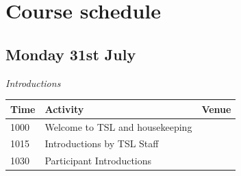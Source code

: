 \documentclass[12pt,]{book}
\theoremstyle{definition}
\theoremstyle{definition}
\theoremstyle{remark}
\begin{document}
\chapter*{Course schedule}\label{course-schedule}

\section*{Monday 31st July}\label{monday-31st-july}

\emph{Introductions}

\begin{longtable}[]{@{}lll@{}}
\toprule
\begin{minipage}[b]{0.09\columnwidth}\raggedright\strut
Time\strut
\end{minipage} & \begin{minipage}[b]{0.38\columnwidth}\raggedright\strut
Activity\strut
\end{minipage} & \begin{minipage}[b]{0.38\columnwidth}\raggedright\strut
Venue\strut
\end{minipage}\tabularnewline
\midrule
\endhead
\begin{minipage}[t]{0.09\columnwidth}\raggedright\strut
1000\strut
\end{minipage} & \begin{minipage}[t]{0.38\columnwidth}\raggedright\strut
Welcome to TSL and housekeeping\strut
\end{minipage} & \begin{minipage}[t]{0.38\columnwidth}\raggedright\strut
\strut
\end{minipage}\tabularnewline
\begin{minipage}[t]{0.09\columnwidth}\raggedright\strut
1015\strut
\end{minipage} & \begin{minipage}[t]{0.38\columnwidth}\raggedright\strut
Introductions by TSL Staff\strut
\end{minipage} & \begin{minipage}[t]{0.38\columnwidth}\raggedright\strut
\strut
\end{minipage}\tabularnewline
\begin{minipage}[t]{0.09\columnwidth}\raggedright\strut
1030\strut
\end{minipage} & \begin{minipage}[t]{0.38\columnwidth}\raggedright\strut
Participant Introductions\strut

\end{minipage}
\end{longtable}
\end{document}
